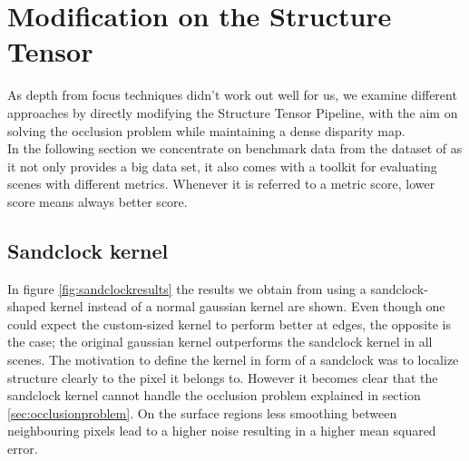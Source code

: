 \documentclass  [
  paper    = a4,
  BCOR     = 10mm,
  twoside,
  fontsize = 12pt,
  fleqn,
  toc      = bibnumbered,
  toc      = listofnumbered,
  numbers  = noendperiod,
  headings = normal,
  listof   = leveldown,
  version  = 3.03
]                                       {scrreprt}
\begin{document}
	 

\section{Modification on the Structure Tensor}
As depth from focus techniques didn't work out well for us, we examine different approaches by directly modifying the Structure Tensor Pipeline, with the aim on solving the occlusion problem while maintaining a dense disparity map.\\
In the following section we concentrate on benchmark data from the dataset of \cite{honauer2016benchmark} as it not only provides a big data set, it also comes with a toolkit for evaluating scenes with different metrics. Whenever it is referred to a metric score, lower score means always better score.
\subsection{Sandclock kernel}
In figure \ref{fig:sandclockresults} the results we obtain from using a sandclock-shaped kernel instead of a normal gaussian kernel are shown. Even though one could expect the custom-sized kernel to perform better at edges, the opposite is the case; the original gaussian kernel outperforms the sandclock kernel in all scenes. The motivation to define the kernel in form of a sandclock was to localize structure clearly to the pixel it belongs to. However it becomes clear that the sandclock kernel cannot handle the occlusion problem explained in section \ref{sec:occlusionproblem}. On the surface regions less smoothing between neighbouring pixels lead to a higher noise resulting in a higher mean squared error. 
\end{document}
